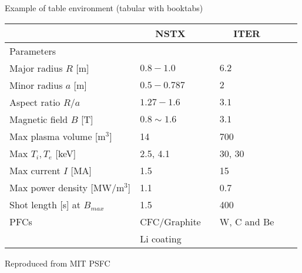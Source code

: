 \documentclass{beamer}
\begin{document}
\begin{frame}{Example of table environment (tabular with booktabs)}
\begin{table}\centering
\begin{tabular}{@{}llclcl@{}}\toprule[2 pt]
& \multicolumn{1}{c}{NSTX}  && \multicolumn{1}{c}{ITER} \\
\midrule
\phantom{a}Parameters & &&  \\
\phantom{a}Major radius $R$ [m] 	&	$0.8-1.0$	 && 	$6.2$		\\
\phantom{a}Minor radius $a$ [m] 	&	$0.5-0.787$	 &&     $2$	        \\
\phantom{a}Aspect ratio	$R/a$           &       $1.27-1.6$	 && 	$3.1$		\\
\phantom{a}Magnetic field $B$ [T]       &  	$0.8 \sim 1.6$	 && 	$3.1$		\\
\phantom{a}Max plasma volume [$\text{m}^3$]	&14        	 && 	700		\\
\phantom{a}Max  $T_i, T_e$ [keV]	&	2.5, 4.1	 && 	30, 30		\\
\phantom{a}Max current $I$ [MA]         &	1.5        	 && 	15		\\
\phantom{a}Max power density [MW/$\text{m}^3$] &	1.1	         && 	0.7		\\
\phantom{a}Shot length [s] at $B_{max}$  &	1.5        	 && 	400		\\
\phantom{a}PFCs	                        &	CFC/Graphite	 && 	W, C and Be	\\
	                                &	Li coating	 && 			\\
\bottomrule[2 pt]
\end{tabular}
\label{tbl:tokamak_params_juxtaposition}
\end{table}

\tiny{Reproduced from MIT PSFC}

\end{frame}

\end{document}
